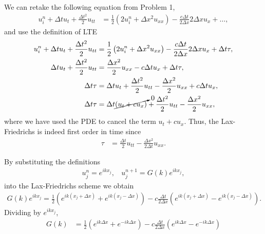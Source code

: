 \begin{questions}

\begin{solution}
We can retake the following equation from Problem 1,
\begin{align*}
u_i^n+\Delta tu_t+\frac{\Delta t^2}{2}u_{tt}&=\frac{1}{2}\left(2u_i^n+\Delta x^2u_{xx}\right)-\frac{c\Delta t}{2\Delta x}2\Delta x u_x+\dots,
\end{align*}
and use the definition of LTE
\begin{align*}
u_i^n+\Delta tu_t+\frac{\Delta t^2}{2}u_{tt}&=\frac{1}{2}\left(2u_i^n+\Delta x^2u_{xx}\right)-\frac{c\Delta t}{2\Delta x}2\Delta x u_x+\Delta t\tau,\\
\Delta tu_t+\frac{\Delta t^2}{2}u_{tt}&=\frac{\Delta x^2}{2}u_{xx}-c\Delta tu_x+\Delta t\tau,\\
\Delta t\tau&=\Delta tu_t+\frac{\Delta t^2}{2}u_{tt}-\frac{\Delta x^2}{2}u_{xx}+c\Delta tu_x,\\
\Delta t\tau&=\Delta t\cancelto{0}{\left(u_t+cu_x\right)}+\frac{\Delta t^2}{2}u_{tt}-\frac{\Delta x^2}{2}u_{xx},\\
\end{align*}
where we have used the PDE to cancel the term $u_t+cu_x$. Thus, the Lax-Friedrichs is indeed first order in time since
\begin{align*}
\tau&=\frac{\Delta t}{2}u_{tt}-\frac{\Delta x^2}{2\Delta t}u_{xx}.
\end{align*}
\end{solution}
\begin{solution}
By substituting the definitions
\begin{align*}
u_j^n=e^{ikx_j},~~~~u_j^{n+1}=G(k)e^{ikx_j},
\end{align*}
into the Lax-Friedrichs scheme we obtain
\begin{align*}
G(k)e^{ikx_j}=\frac{1}{2}\left(e^{ik(x_j+\Delta x)}+e^{ik(x_j-\Delta x)}\right)-c\frac{\Delta t}{2\Delta x}\left(e^{ik(x_j+\Delta x)}-e^{ik(x_j-\Delta x)}\right).
\end{align*}
Dividing by $e^{ikx_j}$,
\begin{align*}
G(k)&=\frac{1}{2}\left(e^{ik\Delta x}+e^{-ik\Delta x}\right)-c\frac{\Delta t}{2\Delta x}\left(e^{ik\Delta x}-e^{-ik\Delta x}\right)\\

\end{align*}
\end{solution}
\end{questions}
